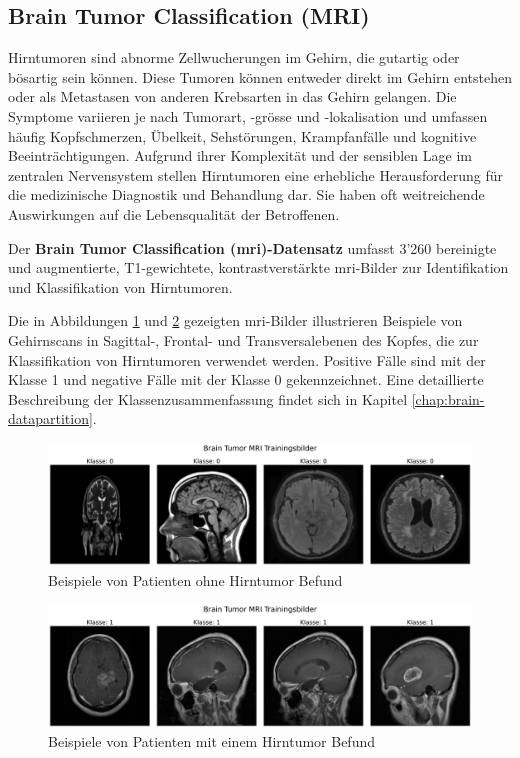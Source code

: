 \subsection{Brain Tumor Classification (MRI)} \label{chap:Brain-Tumor}
Hirntumoren sind abnorme Zellwucherungen im Gehirn, die gutartig oder bösartig sein können. Diese Tumoren können entweder direkt im Gehirn entstehen oder als Metastasen von anderen Krebsarten in das Gehirn gelangen. Die Symptome variieren je nach Tumorart, -grösse und -lokalisation und umfassen häufig Kopfschmerzen, Übelkeit, Sehstörungen, Krampfanfälle und kognitive Beeinträchtigungen. Aufgrund ihrer Komplexität und der sensiblen Lage im zentralen Nervensystem stellen Hirntumoren eine erhebliche Herausforderung für die medizinische Diagnostik und Behandlung dar. Sie haben oft weitreichende Auswirkungen auf die Lebensqualität der Betroffenen.

Der \textbf{Brain Tumor Classification (\acrshort{mri})-Datensatz} \cite{bhuvaji_brain_2020} umfasst 3'260 bereinigte und \gls{augmentiert}e, T1-gewichtete, kontrastverstärkte \acrshort{mri}-Bilder zur Identifikation und Klassifikation von Hirntumoren.

Die in Abbildungen \ref{fig:brain-beispiele-klasse0} und \ref{fig:brain-beispiele-klasse1} gezeigten \acrshort{mri}-Bilder illustrieren Beispiele von Gehirnscans in Sagittal-, Frontal- und Transversalebenen des Kopfes, die zur Klassifikation von Hirntumoren verwendet werden. Positive Fälle sind mit der Klasse 1 und negative Fälle mit der Klasse 0 gekennzeichnet. Eine detaillierte Beschreibung der Klassenzusammenfassung findet sich in Kapitel \ref{chap:brain-datapartition}.

\begin{figure}[H]
    \centering
    \includegraphics[width=\linewidth]{01-images/03-data/brain-klasse0.png}
    \caption{Beispiele von Patienten ohne Hirntumor Befund}
    \label{fig:brain-beispiele-klasse0}
\end{figure}

\begin{figure}[H]
    \centering
    \includegraphics[width=\linewidth]{01-images/03-data/brain-klasse1.png}
    \caption{Beispiele von Patienten mit einem Hirntumor Befund}
    \label{fig:brain-beispiele-klasse1}
\end{figure}

